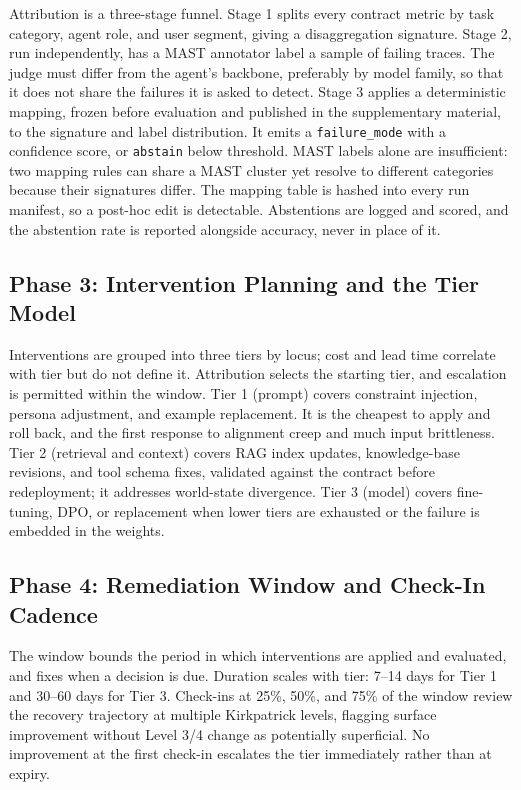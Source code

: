 \documentclass[conference]{IEEEtran}
\begin{document}
Attribution is a three-stage funnel. Stage 1 splits every contract metric by task category, agent role, and user segment, giving a disaggregation signature. Stage 2, run independently, has a MAST annotator \cite{ref8} label a sample of failing traces. The judge must differ from the agent's backbone, preferably by model family, so that it does not share the failures it is asked to detect. Stage 3 applies a deterministic mapping, frozen before evaluation and published in the supplementary material, to the signature and label distribution. It emits a \texttt{failure\_mode} with a confidence score, or \texttt{abstain} below threshold. MAST labels alone are insufficient: two mapping rules can share a MAST cluster yet resolve to different categories because their signatures differ. The mapping table is hashed into every run manifest, so a post-hoc edit is detectable. Abstentions are logged and scored, and the abstention rate is reported alongside accuracy, never in place of it.

\subsection{Phase 3: Intervention Planning and the Tier Model}

Interventions are grouped into three tiers by locus; cost and lead time correlate with tier but do not define it. Attribution selects the starting tier, and escalation is permitted within the window. Tier 1 (prompt) covers constraint injection, persona adjustment, and example replacement. It is the cheapest to apply and roll back, and the first response to alignment creep and much input brittleness. Tier 2 (retrieval and context) covers RAG index updates, knowledge-base revisions, and tool schema fixes, validated against the contract before redeployment; it addresses world-state divergence. Tier 3 (model) covers fine-tuning, DPO, or replacement when lower tiers are exhausted or the failure is embedded in the weights.

\subsection{Phase 4: Remediation Window and Check-In Cadence}

The window bounds the period in which interventions are applied and evaluated, and fixes when a decision is due. Duration scales with tier: 7--14 days for Tier 1 and 30--60 days for Tier 3. Check-ins at 25\%, 50\%, and 75\% of the window review the recovery trajectory at multiple Kirkpatrick levels, flagging surface improvement without Level 3/4 change as potentially superficial. No improvement at the first check-in escalates the tier immediately rather than at expiry.
\end{document}
